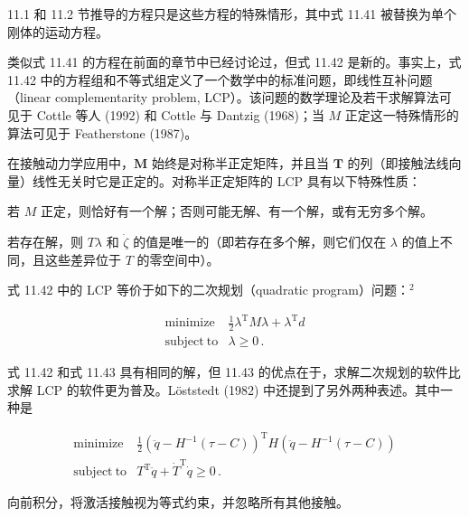 \documentclass[10pt,a4paper]{book}
\theoremstyle{thmstyle} %
\theoremstyle{defstyle} %
\theoremstyle{prostyle} %
\begin{document}
11.1 和 11.2 节推导的方程只是这些方程的特殊情形，其中式 11.41 被替换为单个刚体的运动方程。



类似式 11.41 的方程在前面的章节中已经讨论过，但式 11.42 是新的。事实上，式 11.42 中的方程组和不等式组定义了一个数学中的标准问题，即线性互补问题（linear complementarity problem, LCP）。该问题的数学理论及若干求解算法可见于 Cottle 等人 (1992) 和 Cottle 与 Dantzig (1968)；当 $M$ 正定这一特殊情形的算法可见于 Featherstone (1987)。



在接触动力学应用中，$\boldsymbol{M}$ 始终是对称半正定矩阵，并且当 $\boldsymbol{T}$ 的列（即接触法线向量）线性无关时它是正定的。对称半正定矩阵的 LCP 具有以下特殊性质：



若 $M$ 正定，则恰好有一个解；否则可能无解、有一个解，或有无穷多个解。



若存在解，则 $T\lambda$ 和 $\dot{\zeta}$ 的值是唯一的（即若存在多个解，则它们仅在 $\lambda$ 的值上不同，且这些差异位于 $T$ 的零空间中）。



式 11.42 中的 LCP 等价于如下的二次规划（quadratic program）问题：$^{2}$



$$
\begin{array}{rl} { \mathrm { m i n i m i z e } } & { { }  \frac { 1 } { 2 } \lambda ^{\mathrm { T} } M \lambda + \lambda ^{\mathrm { T} } d } \\{ \mathrm { s u b j e c t ~ t o } } & { { }  \lambda \geq 0 \, . } \end{array}
$$



式 11.42 和式 11.43 具有相同的解，但 11.43 的优点在于，求解二次规划的软件比求解 LCP 的软件更为普及。Löststedt (1982) 中还提到了另外两种表述。其中一种是



$$
\begin{array}{rl} { \mathrm { m i n i m i z e }  } & { \frac { 1 } { 2 } ( \ddot { q } - H ^{- 1} ( \tau - C ) ) ^{\mathrm { T} } H ( \ddot { q } - H ^{- 1} ( \tau - C ) ) } \\{ \mathrm { s u b j e c t ~ t o }  } & { T ^{\mathrm { T} } \ddot { q } + \dot { T } ^{\mathrm { T} } \dot { q } \geq 0 \, . } \end{array}
$$



向前积分，将激活接触视为等式约束，并忽略所有其他接触。
\end{document}
